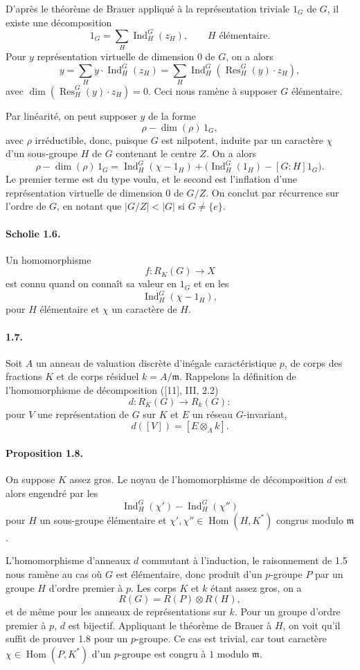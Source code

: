 \documentclass[10pt]{article}
\newcommand{\Hom}{\operatorname{Hom}}
\newcommand{\Ind}{\operatorname{Ind}}
\newcommand{\Res}{\operatorname{Res}}
\providecommand{\Hom}{\operatorname{Hom}}
\providecommand{\Hom}{\operatorname{Hom}}
\providecommand{\Hom}{\operatorname{Hom}}
\providecommand{\Ind}{\operatorname{Ind}}
\begin{document}
D'après le théorème de Brauer appliqué à la représentation triviale \(1_G\) de \(G\), il existe une décomposition
\[
1_G=\sum_H \Ind_H^G(z_H),
\qquad H\text{ élémentaire}.
\]
Pour \(y\) représentation virtuelle de dimension \(0\) de \(G\), on a alors
\[
y=\sum_H y\cdot \Ind_H^G(z_H)
  =\sum_H\Ind_H^G(\Res_H^G(y)\cdot z_H),
\]
avec \(\dim(\Res_H^G(y)\cdot z_H)=0\). Ceci nous ramène à supposer \(G\) élémentaire.

Par linéarité, on peut supposer \(y\) de la forme
\[
\rho-\dim(\rho)\,1_G,
\]
avec \(\rho\) irréductible, donc, puisque \(G\) est nilpotent, induite par un caractère \(\chi\) d'un sous-groupe \(H\) de \(G\) contenant le centre \(Z\). On a alors
\[
\rho-\dim(\rho)\,1_G
=
\Ind_H^G(\chi-1_H)+\bigl(\Ind_H^G(1_H)-[G:H]1_G\bigr).
\]
Le premier terme est du type voulu, et le second est l'inflation d'une représentation virtuelle de dimension \(0\) de \(G/Z\). On conclut par récurrence sur l'ordre de \(G\), en notant que \(|G/Z|<|G|\) si \(G\ne\{e\}\).

\paragraph{Scholie 1.6.} Un homomorphisme
\[
f:R_K(G)\longrightarrow X
\]
est connu quand on connaît sa valeur en \(1_G\) et en les
\[
\Ind_H^G(\chi-1_H),
\]
pour \(H\) élémentaire et \(\chi\) un caractère de \(H\).

\paragraph{1.7.} Soit \(A\) un anneau de valuation discrète d'inégale caractéristique \(p\), de corps des fractions \(K\) et de corps résiduel \(k=A/\mathfrak m\). Rappelons la définition de l'homomorphisme de décomposition ([11], III, 2.2)
\[
d:R_K(G)\longrightarrow R_k(G):
\]
pour \(V\) une représentation de \(G\) sur \(K\) et \(E\) un réseau \(G\)-invariant,
\[
d([V])=[E\otimes_Ak].
\]




\paragraph{Proposition 1.8.} On suppose \(K\) assez gros. Le noyau de l'homomorphisme de décomposition \(d\) est alors engendré par les
\[
\Ind_H^G(\chi')-\Ind_H^G(\chi'')
\]
pour \(H\) un sous-groupe élémentaire et \(\chi',\chi''\in\Hom(H,K^*)\) congrus modulo \(\mathfrak m\).

L'homomorphisme d'anneaux \(d\) commutant à l'induction, le raisonnement de 1.5 nous ramène au cas où \(G\) est élémentaire, donc produit d'un \(p\)-groupe \(P\) par un groupe \(H\) d'ordre premier à \(p\). Les corps \(K\) et \(k\) étant assez gros, on a
\[
R(G)=R(P)\otimes R(H),
\]
et de même pour les anneaux de représentations sur \(k\). Pour un groupe d'ordre premier à \(p\), \(d\) est bijectif. Appliquant le théorème de Brauer à \(H\), on voit qu'il suffit de prouver 1.8 pour un \(p\)-groupe. Ce cas est trivial, car tout caractère \(\chi\in\Hom(P,K^*)\) d'un \(p\)-groupe est congru à \(1\) modulo \(\mathfrak m\).
\end{document}
